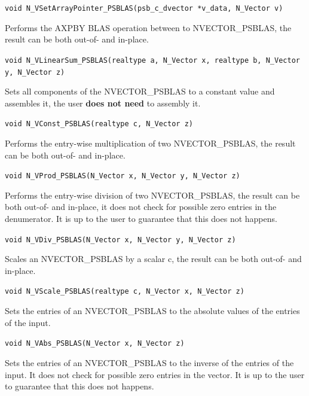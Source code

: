 \documentclass[twoside,a4paper]{refart}
\theoremstyle{definition}
\begin{document}
\begin{description}
 	 \lstinline[style=CStyle]|void N_VSetArrayPointer_PSBLAS(psb_c_dvector *v_data, N_Vector v)|
 	
 	\item[\fbox{\texttt{N\_VLinearSum\_PSBLAS}}] Performs the AXPBY BLAS operation between to  NVECTOR\_PSBLAS, the result can be both out-of- and in-place.
 	
 	 \lstinline[style=CStyle]|void N_VLinearSum_PSBLAS(realtype a, N_Vector x, realtype b, N_Vector y, N_Vector z)|
 	
 	\item[\fbox{\texttt{N\_VConst\_PSBLAS}}] Sets all components of the NVECTOR\_PSBLAS to a constant value and assembles it, the user \textbf{does not need} to assembly it.
 	
 	 \lstinline[style=CStyle]|void N_VConst_PSBLAS(realtype c, N_Vector z)|
 	
 	\item[\fbox{\texttt{N\_VProd\_PSBLAS}}] Performs the entry-wise multiplication of two NVECTOR\_PSBLAS, the result can be both out-of- and in-place.
 	
 	 \lstinline[style=CStyle]|void N_VProd_PSBLAS(N_Vector x, N_Vector y, N_Vector z)|
 	
 	\item[\fbox{\texttt{N\_VDiv\_PSBLAS}}] Performs the entry-wise division of two NVECTOR\_PSBLAS, the result can be both out-of- and in-place, it does not check for possible zero entries in the denumerator. It is up to the user to guarantee that this does not happens.
 	
 	 \lstinline[style=CStyle]|void N_VDiv_PSBLAS(N_Vector x, N_Vector y, N_Vector z)|
 	
 	\item[\fbox{\texttt{N\_VScale\_PSBLAS}}] Scales an NVECTOR\_PSBLAS by a scalar c, the result can be both out-of- and in-place.
 	
 	 \lstinline[style=CStyle]|void N_VScale_PSBLAS(realtype c, N_Vector x, N_Vector z)|
 	
 	\item[\fbox{\texttt{N\_VAbs\_PSBLAS}}] Sets the entries of an NVECTOR\_PSBLAS to the absolute values of the entries of the input.
 	
 	 \lstinline[style=CStyle]|void N_VAbs_PSBLAS(N_Vector x, N_Vector z)|
 	
 	\item[\fbox{\texttt{N\_VInv\_PSBLAS}}] Sets the entries of an NVECTOR\_PSBLAS to the inverse of the entries of the input. It does not check for possible zero entries in the vector. It is up to the user to guarantee that this does not happens.
 	

\end{description}
\end{document}
